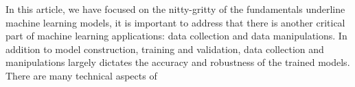 In this article, we have focused on the nitty-gritty of the fundamentals underline machine learning models, it is important to address that there is another critical part of machine learning applications: data collection and data manipulations. In addition to model construction, training and validation, data collection and manipulations largely dictates the accuracy and robustness of the trained models. There are many technical aspects of 